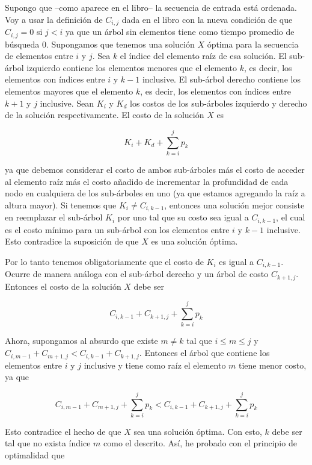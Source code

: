 \documentclass{article}
\begin{document}
\section{}

Supongo que --como aparece en el libro-- la secuencia de entrada está ordenada.
Voy a usar la definición de $C_{i,j}$ dada en el libro con la nueva condición de que
$C_{i,j} = 0$ si $j < i$ ya que un árbol sin elementos tiene como tiempo promedio de
búsqueda $0$. Supongamos que tenemos una solución $X$
óptima para la secuencia de elementos entre $i$ y $j$. Sea $k$ el índice del elemento
raíz de esa solución. El sub-árbol izquierdo contiene los elementos menores que el elemento
$k$, es decir, los elementos con índices entre $i$ y $k-1$ inclusive. El sub-árbol derecho contiene
los elementos mayores que el elemento $k$, es decir, los elementos con índices entre $k+1$ y $j$
inclusive. Sean $K_i$ y $K_d$ los costos de los sub-árboles izquierdo y
derecho de la solución respectivamente. El costo de la solución $X$ es

$$
K_i + K_d + \sum_{k=i}^j p_k
$$

ya que debemos considerar el costo de ambos sub-árboles más el costo de acceder al
elemento raíz más el costo añadido de incrementar la profundidad de cada nodo en
cualquiera de los sub-árboles en uno (ya que estamos agregando la raíz a altura mayor).
Si tenemos que $K_i \neq C_{i,k-1}$, entonces una solución mejor consiste en reemplazar
el sub-árbol $K_i$ por uno tal que su costo sea igual a $C_{i,k-1}$, el cual es el costo
mínimo para un sub-árbol con los elementos entre $i$ y $k-1$ inclusive. Esto contradice
la suposición de que $X$ es una solución óptima.

Por lo tanto tenemos obligatoriamente que el costo de $K_i$ es igual a $C_{i,k-1}$.
Ocurre de manera análoga con el sub-árbol derecho y un árbol de costo $C_{k+1,j}$.
Entonces el costo de la solución $X$ debe ser 

$$
C_{i,k-1} + C_{k+1,j} + \sum_{k=i}^j p_k
$$

Ahora, supongamos al absurdo que existe $m \neq k$ tal que $i \leq m \leq j$ y
$C_{i,m-1}+C_{m+1,j} < C_{i,k-1}+C_{k+1,j}$. Entonces el árbol que contiene los
elementos entre $i$ y $j$ inclusive y tiene como raíz el elemento $m$ tiene menor
costo, ya que 

$$
C_{i,m-1} + C_{m+1,j} + \sum_{k=i}^j p_k < C_{i,k-1} + C_{k+1,j} + \sum_{k=i}^j p_k
$$

Esto contradice el hecho de que $X$ sea una solución óptima. Con esto, $k$ debe ser tal que
no exista índice $m$ como el descrito. Así, he probado con el principio de optimalidad
que
\end{document}
